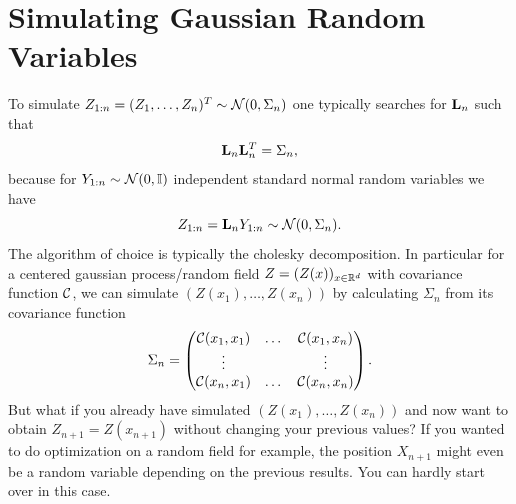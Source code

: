 \section{Simulating Gaussian Random Variables}

To simulate \(Z_{1:n} = (Z_1,\dots,Z_n)^T \sim \mathcal{N}(0, \Sigma_n)\) one typically
searches for \(\mathbf{L}_n\) such that
\[
	\mathbf{L}_n \mathbf{L}_n^T = \Sigma_n,
\]
because for \(Y_{1:n}\sim\mathcal{N}(0,\mathbb{I})\) independent standard normal
random variables we have
\[
	Z_{1:n} = \mathbf{L}_n Y_{1:n} \sim \mathcal{N}(0, \Sigma_n).
\]
The algorithm of choice is typically the cholesky decomposition.
In particular for a centered gaussian process/random field 
\(Z=(Z(x))_{x\in\mathbb{R}^d}\) with covariance function \(\mathcal{C}\),
we can simulate \((Z(x_1),\dots, Z(x_n))\) by calculating \(\Sigma_n\) from its
covariance function
\[
	\Sigma_n = \begin{pmatrix}
		\mathcal{C}(x_1, x_1) &\dots &\mathcal{C}(x_1, x_n)\\
		\vdots &  & \vdots \\
		\mathcal{C}(x_n, x_1) &\dots &\mathcal{C}(x_n, x_n)
	\end{pmatrix}.
\]
But what if you already have simulated \((Z(x_1),\dots,Z(x_n))\) and now want
to obtain \(Z_{n+1} = Z(x_{n+1})\) without changing your previous values? If you wanted
to do optimization on a random field for example, the position \(X_{n+1}\) might
even be a random variable depending on the previous results. You can hardly
start over in this case.
